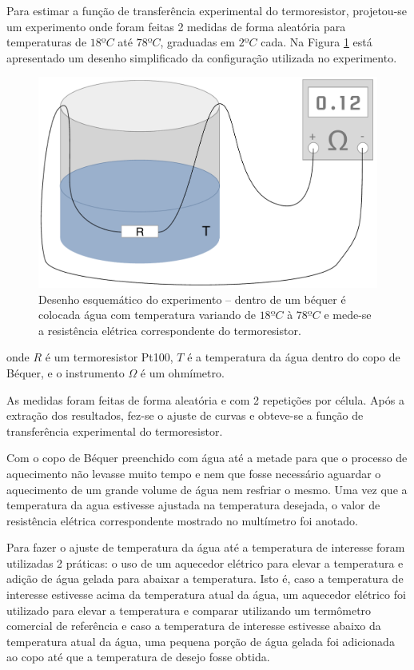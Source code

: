 \documentclass[a4paper]{instrumentacao}
\begin{document}
Para estimar a função de transferência experimental do termoresistor, projetou-se um experimento onde foram feitas 2 medidas de forma aleatória para temperaturas de $18ºC$ até $78ºC$, graduadas em $2ºC$ cada. Na Figura \ref{fig:pt100-esquematico} está apresentado um desenho simplificado da configuração utilizada no experimento.

\begin{figure}[H]
\center
\includegraphics[width=\textwidth]{Bequer.pdf}
\caption{Desenho esquemático do experimento -- dentro de um béquer é colocada água com temperatura variando de $18ºC$ à $78ºC$ e mede-se a resistência elétrica correspondente do termoresistor.}
\label{fig:pt100-esquematico}
\end{figure}

\noindent
onde $R$ é um termoresistor Pt100, $T$ é a temperatura da água dentro do copo de Béquer, e o instrumento $\Omega$ é um ohmímetro.

As medidas foram feitas de forma aleatória e com 2 repetições por célula. Após a extração dos resultados, fez-se o ajuste de curvas e obteve-se a função de transferência experimental do termoresistor.

Com o copo de Béquer preenchido com água até a metade para que o processo de aquecimento não levasse muito tempo e nem que fosse necessário aguardar o aquecimento de um grande volume de água nem resfriar o mesmo. Uma vez que a temperatura da agua estivesse ajustada na temperatura desejada, o valor de resistência elétrica correspondente mostrado no multímetro foi anotado.

Para fazer o ajuste de temperatura da água até a temperatura de interesse foram utilizadas 2 práticas: o uso de um aquecedor elétrico para elevar a temperatura e adição de água gelada para abaixar a temperatura. Isto é, caso a temperatura de interesse estivesse acima da temperatura atual da água, um aquecedor elétrico foi utilizado para elevar a temperatura e comparar utilizando um termômetro comercial de referência e caso a temperatura de interesse estivesse abaixo da temperatura atual da água, uma pequena porção de água gelada foi adicionada ao copo até que a temperatura de desejo fosse obtida.
\end{document}
